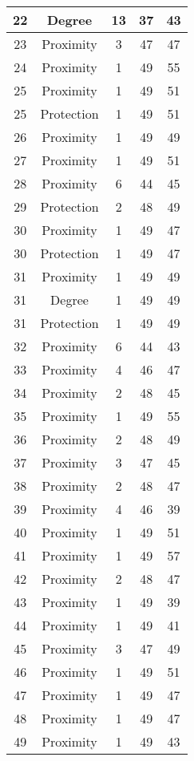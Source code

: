 \documentclass[results.tex]{subfiles}
\begin{document}
\begin{center}
\begin{tabular}{| c || c | c | c | c |}
    \hline
    22 & Degree & 13 & 37 & 43 \\ 
    \hline
    23 & Proximity & 3 & 47 & 47 \\ 
    \hline
    24 & Proximity & 1 & 49 & 55 \\ 
    \hline
    25 & Proximity & 1 & 49 & 51 \\ 
    \hline
    25 & Protection & 1 & 49 & 51 \\ 
    \hline
    26 & Proximity & 1 & 49 & 49 \\ 
    \hline
    27 & Proximity & 1 & 49 & 51 \\ 
    \hline
    28 & Proximity & 6 & 44 & 45 \\ 
    \hline
    29 & Protection & 2 & 48 & 49 \\ 
    \hline
    30 & Proximity & 1 & 49 & 47 \\ 
    \hline
    30 & Protection & 1 & 49 & 47 \\ 
    \hline
    31 & Proximity & 1 & 49 & 49 \\ 
    \hline
    31 & Degree & 1 & 49 & 49 \\ 
    \hline
    31 & Protection & 1 & 49 & 49 \\ 
    \hline
    32 & Proximity & 6 & 44 & 43 \\ 
    \hline
    33 & Proximity & 4 & 46 & 47 \\ 
    \hline
    34 & Proximity & 2 & 48 & 45 \\ 
    \hline
    35 & Proximity & 1 & 49 & 55 \\ 
    \hline
    36 & Proximity & 2 & 48 & 49 \\ 
    \hline
    37 & Proximity & 3 & 47 & 45 \\ 
    \hline
    38 & Proximity & 2 & 48 & 47 \\ 
    \hline
    39 & Proximity & 4 & 46 & 39 \\ 
    \hline
    40 & Proximity & 1 & 49 & 51 \\ 
    \hline
    41 & Proximity & 1 & 49 & 57 \\ 
    \hline
    42 & Proximity & 2 & 48 & 47 \\ 
    \hline
    43 & Proximity & 1 & 49 & 39 \\ 
    \hline
    44 & Proximity & 1 & 49 & 41 \\ 
    \hline
    45 & Proximity & 3 & 47 & 49 \\ 
    \hline
    46 & Proximity & 1 & 49 & 51 \\ 
    \hline
    47 & Proximity & 1 & 49 & 47 \\ 
    \hline
    48 & Proximity & 1 & 49 & 47 \\ 
    \hline
    49 & Proximity & 1 & 49 & 43 \\ 
    \hline   \end{tabular}
\end{center}
\end{document}
